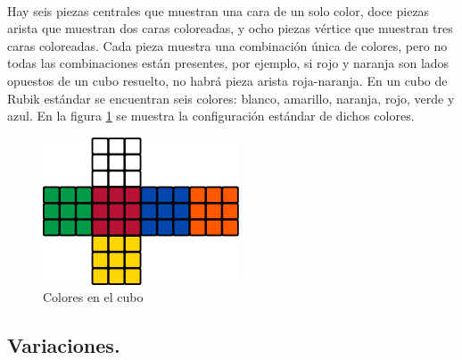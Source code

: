 \documentclass[12pt, letterpaper]{article}
\begin{document}
\paragraph{}
Hay seis piezas centrales que muestran una cara de un solo color, doce piezas arista que muestran dos caras coloreadas, y ocho piezas vértice que muestran tres caras coloreadas. Cada pieza muestra una combinación única de colores, pero no todas las combinaciones están presentes, por ejemplo, si rojo y naranja son lados opuestos de un cubo resuelto, no habrá pieza arista roja-naranja. En un cubo de Rubik estándar se encuentran seis colores: blanco, amarillo, naranja, rojo, verde y azul. En la figura \ref{fig:stickers} se muestra la configuración estándar de dichos colores.
\begin{figure}[hb]
	\centering
	\includegraphics[scale=0.5]{images/stickers.png}
	\caption{Colores en el cubo}
	\label{fig:stickers}
\end{figure}
\subsection{Variaciones.}
\end{document}
